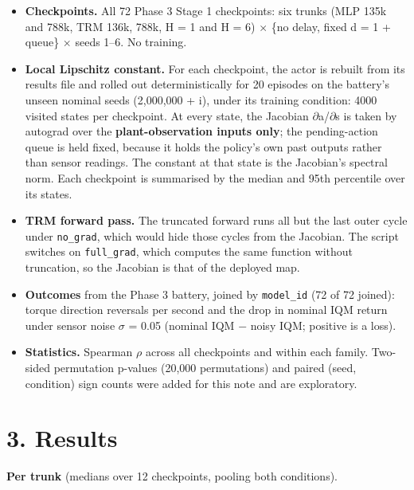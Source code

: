 \documentclass[11pt]{article}
\begin{document}
\begin{itemize}
\item \textbf{Checkpoints.} All 72 Phase 3 Stage 1 checkpoints: six trunks (MLP 135k and 788k, TRM 136k, 788k, H = 1 and H = 6) $\times$ \{no delay, fixed d = 1 + queue\} $\times$ seeds 1--6. No training.
\item \textbf{Local Lipschitz constant.} For each checkpoint, the actor is rebuilt from its results file and rolled out deterministically for 20 episodes on the battery's unseen nominal seeds (2,000,000 + i), under its training condition: 4000 visited states per checkpoint. At every state, the Jacobian $\partial$a/$\partial$s is taken by autograd over the \textbf{plant-observation inputs only}; the pending-action queue is held fixed, because it holds the policy's own past outputs rather than sensor readings. The constant at that state is the Jacobian's spectral norm. Each checkpoint is summarised by the median and 95th percentile over its states.
\item \textbf{TRM forward pass.} The truncated forward runs all but the last outer cycle under \texttt{no\_grad}, which would hide those cycles from the Jacobian. The script switches on \texttt{full\_grad}, which computes the same function without truncation, so the Jacobian is that of the deployed map.
\item \textbf{Outcomes} from the Phase 3 battery, joined by \texttt{model\_id} (72 of 72 joined): torque direction reversals per second and the drop in nominal IQM return under sensor noise $\sigma$ = 0.05 (nominal IQM $-$ noisy IQM; positive is a loss).
\item \textbf{Statistics.} Spearman $\rho$ across all checkpoints and within each family. Two-sided permutation p-values (20,000 permutations) and paired (seed, condition) sign counts were added for this note and are exploratory.
\end{itemize}



\section*{3. Results}



\textbf{Per trunk} (medians over 12 checkpoints, pooling both conditions).
\end{document}
